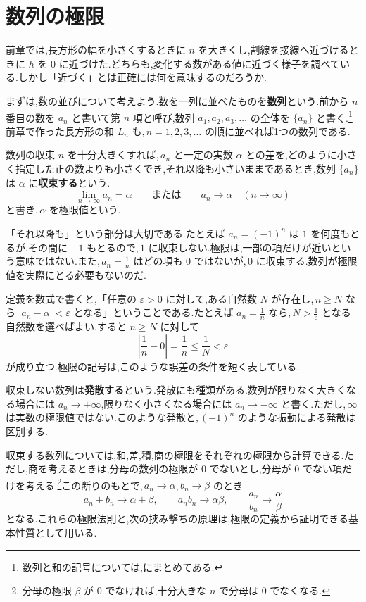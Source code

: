 \section{数列の極限}\label{節:数列極限}
前章では,長方形の幅を小さくするときに $n$ を大きくし,割線を接線へ近づけるときに $h$ を $0$ に近づけた.どちらも,変化する数がある値に近づく様子を調べている.しかし「近づく」とは正確には何を意味するのだろうか.

まずは,数の並びについて考えよう.数を一列に並べたものを\textbf{数列}という.前から $n$ 番目の数を $a_n$ と書いて第 $n$ 項と呼び,数列 $a_1,a_2,a_3,\ldots$ の全体を $\{a_n\}$ と書く.\footnote{数列と和の記号については,にまとめてある.}前章で作った長方形の和 $L_n$ も,\,$n=1,2,3,\ldots$ の順に並べれば1つの数列である.

\begin{definition}{数列の収束}
$n$ を十分大きくすれば,\,$a_n$ と一定の実数 $\alpha$ との差を,どのように小さく指定した正の数よりも小さくでき,それ以降も小さいままであるとき,数列 $\{a_n\}$ は $\alpha$ に\textbf{収束する}という.
\[
 \lim_{n\to\infty}a_n=\alpha
 \qquad\text{または}\qquad a_n\to\alpha\quad(n\to\infty)
\]
と書き,\,$\alpha$ を極限値という.
\end{definition}

「それ以降も」という部分は大切である.たとえば $a_n=(-1)^n$ は $1$ を何度もとるが,その間に $-1$ もとるので,\,$1$ に収束しない.極限は,一部の項だけが近いという意味ではない.また,\,$a_n=\frac1n$ はどの項も $0$ ではないが,\,$0$ に収束する.数列が極限値を実際にとる必要もないのだ.

定義を数式で書くと,「任意の $\varepsilon>0$ に対して,ある自然数 $N$ が存在し,\,$n\ge N$ なら $|a_n-\alpha|<\varepsilon$ となる」ということである.たとえば $a_n=\frac1n$ なら,\,$N>\frac1\varepsilon$ となる自然数を選べばよい.すると $n\ge N$ に対して
\[
 \left|\frac1n-0\right|=\frac1n\le\frac1N<\varepsilon
\]
が成り立つ.極限の記号は,このような誤差の条件を短く表している.

収束しない数列は\textbf{発散する}という.発散にも種類がある.数列が限りなく大きくなる場合には $a_n\to+\infty$,限りなく小さくなる場合には $a_n\to-\infty$ と書く.ただし,\,$\infty$ は実数の極限値ではない.このような発散と,\,$(-1)^n$ のような振動による発散は区別する.

収束する数列については,和,差,積,商の極限をそれぞれの極限から計算できる.ただし,商を考えるときは,分母の数列の極限が $0$ でないとし,分母が $0$ でない項だけを考える.\footnote{分母の極限 $\beta$ が $0$ でなければ,十分大きな $n$ で分母は $0$ でなくなる.}この断りのもとで,\,$a_n\to\alpha$,\,$b_n\to\beta$ のとき
\[
 a_n+b_n\to\alpha+\beta,\qquad
 a_nb_n\to\alpha\beta,\qquad
 \frac{a_n}{b_n}\to\frac\alpha\beta
\]
となる.これらの極限法則と,次の挟み撃ちの原理は,極限の定義から証明できる基本性質として用いる.

